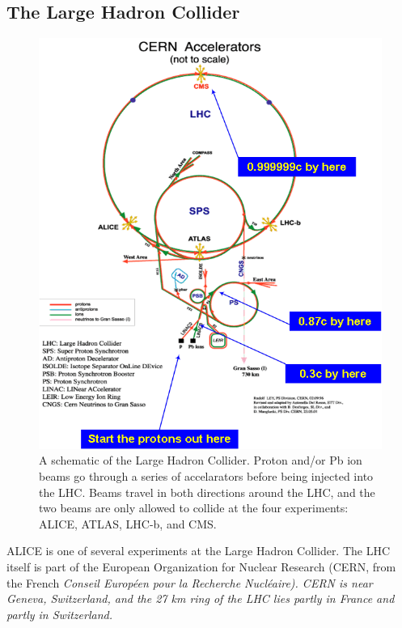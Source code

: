 \subsection{The Large Hadron Collider}
\label{sec:TheLHC}

\begin{figure}[hbtp]
\includegraphics[width=36pc]{Figures/BorrowedFigures/LHC.png}
\caption[Schematic of the LHC]{A schematic of the Large Hadron Collider. 
Proton and/or Pb ion beams go through a series of accelarators before being injected into the LHC. Beams travel in both directions around the LHC, and the two beams are only allowed to collide at the four experiments: ALICE, ATLAS, LHC-b, and CMS.}
\label{fig:LHC}
\end{figure}

ALICE is one of several experiments at the Large Hadron Collider.
The LHC itself is part of the European Organization  for Nuclear Research (CERN, from the French \it Conseil Europ\'een pour la Recherche Nucl\'eaire\rm).
CERN is near Geneva, Switzerland, and the 27 km ring of the LHC lies partly in France and partly in Switzerland.

